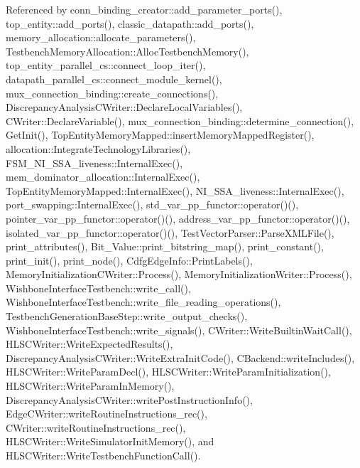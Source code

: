 Referenced by conn\+\_\+binding\+\_\+creator\+::add\+\_\+parameter\+\_\+ports(), top\+\_\+entity\+::add\+\_\+ports(), classic\+\_\+datapath\+::add\+\_\+ports(), memory\+\_\+allocation\+::allocate\+\_\+parameters(), Testbench\+Memory\+Allocation\+::\+Alloc\+Testbench\+Memory(), top\+\_\+entity\+\_\+parallel\+\_\+cs\+::connect\+\_\+loop\+\_\+iter(), datapath\+\_\+parallel\+\_\+cs\+::connect\+\_\+module\+\_\+kernel(), mux\+\_\+connection\+\_\+binding\+::create\+\_\+connections(), Discrepancy\+Analysis\+C\+Writer\+::\+Declare\+Local\+Variables(), C\+Writer\+::\+Declare\+Variable(), mux\+\_\+connection\+\_\+binding\+::determine\+\_\+connection(), Get\+Init(), Top\+Entity\+Memory\+Mapped\+::insert\+Memory\+Mapped\+Register(), allocation\+::\+Integrate\+Technology\+Libraries(), F\+S\+M\+\_\+\+N\+I\+\_\+\+S\+S\+A\+\_\+liveness\+::\+Internal\+Exec(), mem\+\_\+dominator\+\_\+allocation\+::\+Internal\+Exec(), Top\+Entity\+Memory\+Mapped\+::\+Internal\+Exec(), N\+I\+\_\+\+S\+S\+A\+\_\+liveness\+::\+Internal\+Exec(), port\+\_\+swapping\+::\+Internal\+Exec(), std\+\_\+var\+\_\+pp\+\_\+functor\+::operator()(), pointer\+\_\+var\+\_\+pp\+\_\+functor\+::operator()(), address\+\_\+var\+\_\+pp\+\_\+functor\+::operator()(), isolated\+\_\+var\+\_\+pp\+\_\+functor\+::operator()(), Test\+Vector\+Parser\+::\+Parse\+X\+M\+L\+File(), print\+\_\+attributes(), Bit\+\_\+\+Value\+::print\+\_\+bitstring\+\_\+map(), print\+\_\+constant(), print\+\_\+init(), print\+\_\+node(), Cdfg\+Edge\+Info\+::\+Print\+Labels(), Memory\+Initialization\+C\+Writer\+::\+Process(), Memory\+Initialization\+Writer\+::\+Process(), Wishbone\+Interface\+Testbench\+::write\+\_\+call(), Wishbone\+Interface\+Testbench\+::write\+\_\+file\+\_\+reading\+\_\+operations(), Testbench\+Generation\+Base\+Step\+::write\+\_\+output\+\_\+checks(), Wishbone\+Interface\+Testbench\+::write\+\_\+signals(), C\+Writer\+::\+Write\+Builtin\+Wait\+Call(), H\+L\+S\+C\+Writer\+::\+Write\+Expected\+Results(), Discrepancy\+Analysis\+C\+Writer\+::\+Write\+Extra\+Init\+Code(), C\+Backend\+::write\+Includes(), H\+L\+S\+C\+Writer\+::\+Write\+Param\+Decl(), H\+L\+S\+C\+Writer\+::\+Write\+Param\+Initialization(), H\+L\+S\+C\+Writer\+::\+Write\+Param\+In\+Memory(), Discrepancy\+Analysis\+C\+Writer\+::write\+Post\+Instruction\+Info(), Edge\+C\+Writer\+::write\+Routine\+Instructions\+\_\+rec(), C\+Writer\+::write\+Routine\+Instructions\+\_\+rec(), H\+L\+S\+C\+Writer\+::\+Write\+Simulator\+Init\+Memory(), and H\+L\+S\+C\+Writer\+::\+Write\+Testbench\+Function\+Call().

